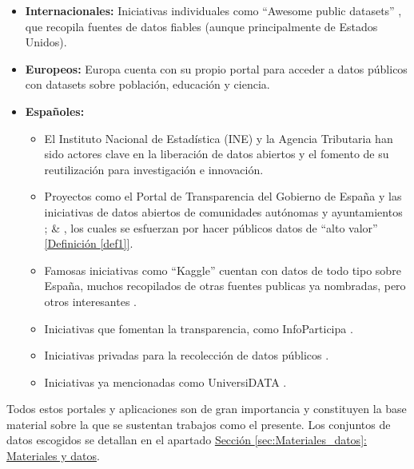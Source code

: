 	\begin{itemize}  %
		\item \textbf{Internacionales:}  
		Iniciativas individuales como ``Awesome public datasets'' \citep{awesomePublicDatasets}, que recopila fuentes de datos fiables (aunque principalmente de Estados Unidos).  
		
		\item \textbf{Europeos:}  
		Europa cuenta con su propio portal para acceder a datos públicos \citep{PortalDatosEuropa} con datasets sobre población, educación y ciencia.  
		
		\item \textbf{Españoles:}
		\begin{itemize}
			\item El Instituto Nacional de Estadística (INE) y la Agencia Tributaria han sido actores clave en la liberación de datos abiertos y el fomento de su reutilización para investigación e innovación.  
			\item Proyectos como el Portal de Transparencia del Gobierno de España y las iniciativas de datos abiertos de comunidades autónomas y ayuntamientos \citep{PortalDatosGob}; \citep{PortalDatosMadrid} \& \citep{PortalRegistradores}, los cuales se esfuerzan por hacer públicos datos de ``alto valor'' \hyperref[def1]{[Definición \ref*{def1}]}.  
			\item Famosas iniciativas como ``Kaggle'' cuentan con datos de todo tipo sobre España, muchos recopilados de otras fuentes publicas ya nombradas, pero otros interesantes \citep{KaggleDatasetsSpain}.
			\item Iniciativas que fomentan la transparencia, como InfoParticipa \citep{PortalInfoparticipa}.  
			\item Iniciativas privadas para la recolección de datos públicos \citep{PortalEsriEspanna}.  
			\item Iniciativas ya mencionadas como UniversiDATA \citep{UniversiDATA}.  
		\end{itemize}
	\end{itemize}
	
	Todos estos portales y aplicaciones son de gran importancia y constituyen la base material sobre la que se sustentan trabajos como el presente. Los conjuntos de datos escogidos se detallan en el apartado \hyperref[sec:Materiales_datos]{Sección \ref*{sec:Materiales_datos}: Materiales y datos}. \\
	
